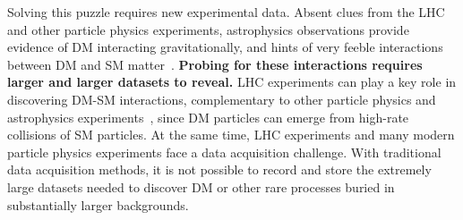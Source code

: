 Solving this puzzle requires new experimental data. 
Absent clues from the LHC and other particle physics experiments, 
astrophysics observations provide evidence of DM interacting gravitationally, and hints of very feeble interactions between DM and SM matter~\cite{Bernal:2017kxu,Steigman:2012nb}. 
\textbf{Probing for these interactions requires larger and larger datasets to reveal.} 
LHC experiments can play a key role in discovering DM-SM interactions, complementary to other particle physics and astrophysics experiments~\cite{Boveia:2018yeb}, since DM particles can emerge from high-rate collisions of SM particles. 
At the same time, LHC experiments and many modern particle physics experiments face a data acquisition challenge.
With traditional data acquisition methods, it is not possible to record and store the extremely large datasets needed to discover DM or other rare processes buried in substantially larger backgrounds. 

